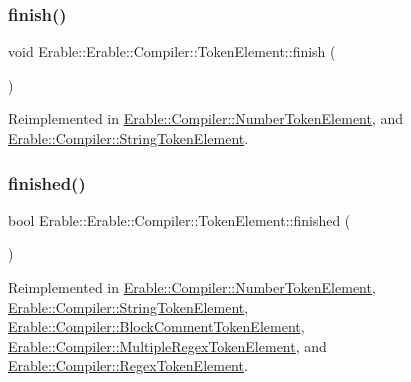 \subsubsection{\texorpdfstring{finish()}{finish()}}
{\footnotesize\ttfamily void Erable\+::\+Erable\+::\+Compiler\+::\+Token\+Element\+::finish (\begin{DoxyParamCaption}{ }\end{DoxyParamCaption})\hspace{0.3cm}{\ttfamily [virtual]}}



Reimplemented in \mbox{\hyperlink{class_erable_1_1_compiler_1_1_number_token_element_a06b45068c205e86e187d27685fe59e96}{Erable\+::\+Compiler\+::\+Number\+Token\+Element}}, and \mbox{\hyperlink{class_erable_1_1_compiler_1_1_string_token_element_acf6ab613a09eb8220be24a83d3e28490}{Erable\+::\+Compiler\+::\+String\+Token\+Element}}.

\mbox{\label{class_erable_1_1_compiler_1_1_token_element_a1ff3e31b4064cd22463c91130a819646}} 
\subsubsection{\texorpdfstring{finished()}{finished()}}
{\footnotesize\ttfamily bool Erable\+::\+Erable\+::\+Compiler\+::\+Token\+Element\+::finished (\begin{DoxyParamCaption}{ }\end{DoxyParamCaption})\hspace{0.3cm}{\ttfamily [virtual]}}



Reimplemented in \mbox{\hyperlink{class_erable_1_1_compiler_1_1_number_token_element_a7f8f35dcc3dac8a2e7566867304feb23}{Erable\+::\+Compiler\+::\+Number\+Token\+Element}}, \mbox{\hyperlink{class_erable_1_1_compiler_1_1_string_token_element_a0fa477d39992b60c916c083ea90f1526}{Erable\+::\+Compiler\+::\+String\+Token\+Element}}, \mbox{\hyperlink{class_erable_1_1_compiler_1_1_block_comment_token_element_ad212efa213376be9172cf48674041c6f}{Erable\+::\+Compiler\+::\+Block\+Comment\+Token\+Element}}, \mbox{\hyperlink{class_erable_1_1_compiler_1_1_multiple_regex_token_element_a3efc3bd3e91c6eff39a0bb97adb699bf}{Erable\+::\+Compiler\+::\+Multiple\+Regex\+Token\+Element}}, and \mbox{\hyperlink{class_erable_1_1_compiler_1_1_regex_token_element_ae97792bfc64def19e42876c7d823b9e4}{Erable\+::\+Compiler\+::\+Regex\+Token\+Element}}.

